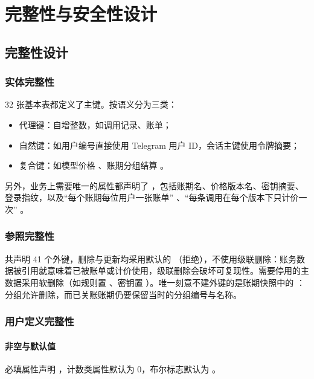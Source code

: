 \section{完整性与安全性设计}

\subsection{完整性设计}

\subsubsection{实体完整性}

32 张基本表都定义了主键。按语义分为三类：
\begin{itemize}
  \item 代理键：自增整数，如调用记录、账单；
  \item 自然键：如用户编号直接使用 Telegram 用户 ID，会话主键使用令牌摘要；
  \item 复合键：如模型价格 、账期分组结算 。
\end{itemize}
另外，业务上需要唯一的属性都声明了 ，包括账期名、价格版本名、密钥摘要、登录指纹，以及“每个账期每位用户一张账单” 、“每条调用在每个版本下只计价一次” 。

\subsubsection{参照完整性}

共声明 41 个外键，删除与更新均采用默认的 （拒绝），不使用级联删除：账务数据被引用就意味着已被账单或计价使用，级联删除会破坏可复现性。需要停用的主数据采用软删除（如规则置 、密钥置 ）。唯一刻意不建外键的是账期快照中的 ：分组允许删除，而已关账账期仍要保留当时的分组编号与名称。

\subsubsection{用户定义完整性}

\paragraph{非空与默认值}
必填属性声明 ，计数类属性默认为 0，布尔标志默认为 。

